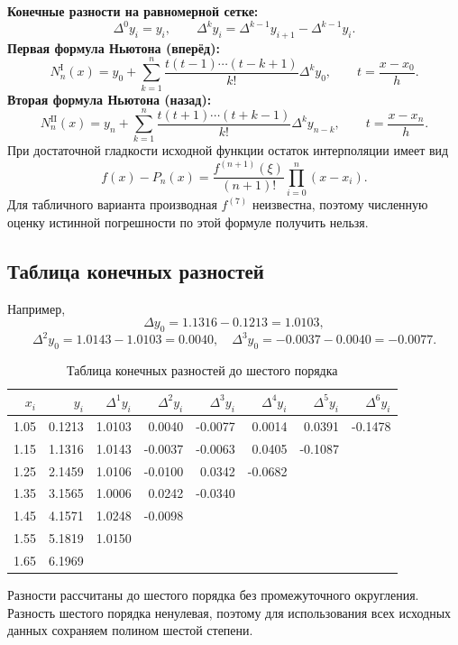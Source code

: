 \documentclass[12pt,a4paper]{article}
\begin{document}
\textbf{Конечные разности на равномерной сетке:}
\[
\Delta^0 y_i=y_i,\qquad \Delta^k y_i=\Delta^{k-1}y_{i+1}-\Delta^{k-1}y_i.
\]
\textbf{Первая формула Ньютона (вперёд):}
\[
N_n^{\mathrm I}(x)=y_0+\sum_{k=1}^{n}\frac{t(t-1)\cdots(t-k+1)}{k!}\Delta^k y_0,
\qquad t=\frac{x-x_0}{h}.
\]
\textbf{Вторая формула Ньютона (назад):}
\[
N_n^{\mathrm {II}}(x)=y_n+\sum_{k=1}^{n}\frac{t(t+1)\cdots(t+k-1)}{k!}\Delta^k y_{n-k},
\qquad t=\frac{x-x_n}{h}.
\]
При достаточной гладкости исходной функции остаток интерполяции имеет вид
\[
f(x)-P_n(x)=\frac{f^{(n+1)}(\xi)}{(n+1)!}\prod_{i=0}^{n}(x-x_i).
\]
Для табличного варианта производная $f^{(7)}$ неизвестна, поэтому численную
оценку истинной погрешности по этой формуле получить нельзя.

\clearpage
\subsection{Таблица конечных разностей}
Например,
\[
\Delta y_0=1.1316-0.1213=1.0103,
\]
\[
\Delta^2y_0=1.0143-1.0103=0.0040,
\quad \Delta^3y_0=-0.0037-0.0040=-0.0077.
\]
\begin{table}[H]
\centering
\small
\caption{Таблица конечных разностей до шестого порядка}
\begin{tabular}{rrrrrrrr}
\toprule
$x_i$ & $y_i$ & $\Delta^1y_i$ & $\Delta^2y_i$ & $\Delta^3y_i$ & $\Delta^4y_i$ & $\Delta^5y_i$ & $\Delta^6y_i$ \\
\midrule
1.05 & 0.1213 & 1.0103 & 0.0040 & -0.0077 & 0.0014 & 0.0391 & -0.1478 \\
1.15 & 1.1316 & 1.0143 & -0.0037 & -0.0063 & 0.0405 & -0.1087 &  \\
1.25 & 2.1459 & 1.0106 & -0.0100 & 0.0342 & -0.0682 &  &  \\
1.35 & 3.1565 & 1.0006 & 0.0242 & -0.0340 &  &  &  \\
1.45 & 4.1571 & 1.0248 & -0.0098 &  &  &  &  \\
1.55 & 5.1819 & 1.0150 &  &  &  &  &  \\
1.65 & 6.1969 &  &  &  &  &  &  \\
\bottomrule
\end{tabular}
\end{table}

Разности рассчитаны до шестого порядка без промежуточного округления.
Разность шестого порядка ненулевая, поэтому для использования всех исходных
данных сохраняем полином шестой степени.
\end{document}
